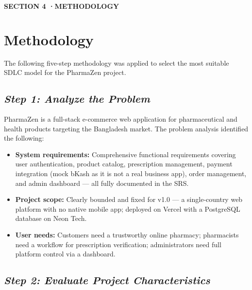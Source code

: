 \documentclass[12pt, a4paper]{article}
\newcommand{\sectionbadge}[2]{%
  \vspace{12pt}\noindent
  \colorbox{pharmagreen}{%
    \parbox{\dimexpr\textwidth-2\fboxsep\relax}{%
      \vspace{4pt}
      \color{white}\small\bfseries\MakeUppercase{Section #1 \quad·\quad #2}
      \vspace{4pt}
    }%
  }\vspace{6pt}
}
\begin{document}
\newpage
\sectionbadge{4}{Methodology}
\section{Methodology}

The following five-step methodology was applied to select the most suitable SDLC model for the PharmaZen project.

\subsection*{\textit{Step 1: Analyze the Problem}}

PharmaZen is a full-stack e-commerce web application for pharmaceutical and health products targeting the Bangladesh market. The problem analysis identified the following:

\begin{itemize}[leftmargin=1.5em, itemsep=4pt]
  \item \textbf{System requirements:} Comprehensive functional requirements covering user authentication, product catalog, prescription management, payment integration (mock bKash as it is not a real business app), order management, and admin dashboard — all fully documented in the SRS.
  \item \textbf{Project scope:} Clearly bounded and fixed for v1.0 — a single-country web platform with no native mobile app; deployed on Vercel with a PostgreSQL database on Neon Tech.
  \item \textbf{User needs:} Customers need a trustworthy online pharmacy; pharmacists need a workflow for prescription verification; administrators need full platform control via a dashboard.
\end{itemize}

\subsection*{\textit{Step 2: Evaluate Project Characteristics}}
\end{document}
